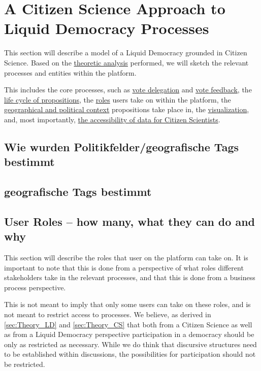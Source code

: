 \chapter{A Citizen Science Approach to Liquid Democracy Processes}
\label{ch:Approach}

This section will describe a model of a Liquid Democracy grounded in Citizen Science. Based on the \href{sec:Theory}{theoretic analysis} performed, we will sketch the relevant processes and entities within the platform. 

This includes the core processes, such as \href{ssec:Model_VoteDelegation}{vote delegation} and \href{ssec:Model_VoteFeedback}{vote feedback}, the \href{ssec:Model_Propositions}{life cycle of propositions}, the \href{ssec:UserRoles}{roles} users take on within the platform, the \href{ssec:Model_Contexts}{geographical and political context} propositions take place in, the \href{ssec:Model_Visualization}{visualization}, and, most importantly, \href{ssec:Model_ResearchersAccess}{the accessibility of data for Citizen Scientists}. 

\section{Wie wurden Politikfelder/geografische Tags bestimmt}
\label{sec:Model_Contexts}
\section{geografische Tags bestimmt}
\label{sec:Model_Contexts}


\section{User Roles -- how many, what they can do and why}
\label{sec:UserRoles}
This section will describe the roles that user on the platform can take on.
It is important to note that this is done from a perspective of what roles different stakeholders take in the relevant processes, and that this is done from a business process perspective.

This is not meant to imply that only some users can take on these roles, and is not meant to restrict access to processes. We believe, as derived in \ref{sec:Theory_LD} and \ref{sec:Theory_CS} that both from a Citizen Science as well as from a Liquid Democracy perspective participation in a democracy should be only as restricted as necessary. While we do think that discursive structures need to be established within discussions, the possibilities for participation should not be restricted.

